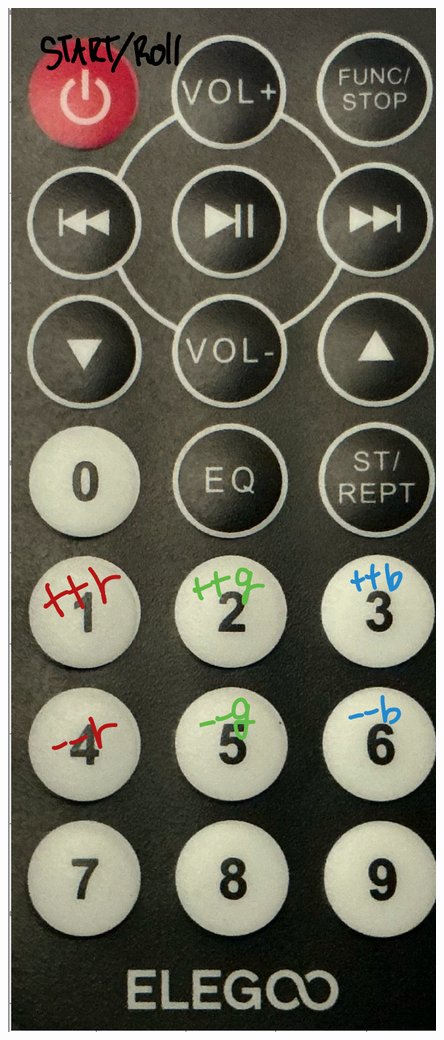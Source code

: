 \documentclass[12pt]{article}
\begin{document}
\begin{itemize}
\begin{minipage}{0.28\textwidth}
    \includegraphics[width=\textwidth]{remote.png}
\end{minipage}


\end{itemize}
\end{document}
